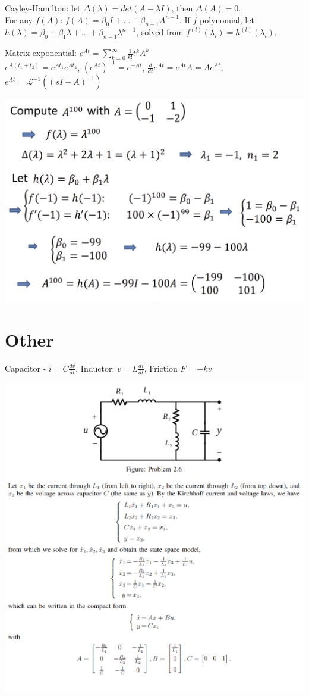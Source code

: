\documentclass[11pt]{article}
\begin{document}
Cayley-Hamilton: let $\Delta(\lambda) = det(A - \lambda I)$, then $\Delta(A) = 0$.\\
For any $f(A)$: $f(A) = \beta_0 I + \dots + \beta_{n-1}A^{n-1}$.
If $f$ polynomial, let $h(\lambda) = \beta_0 + \beta_1 \lambda + \dots + \beta_{n-1} \lambda ^{n-1}$,
solved from $f^{(l)}(\lambda_i) = h^{(l)}(\lambda_i)$.

Matrix exponential: $e^{At} = \sum_{k=0}^\infty \frac{1}{k!} t^k A^k$\\
$e^{A(t_1 + t_2)} = e^{At_1}e^{At_2}$, $(e^{At})^{-1} = e^{-At}$, $\frac{d}{dt} e^{At} = e^{At}A = A e^{At}$,
$e^{At} = \mathcal{L}^{-1}((sI - A)^{-1})$

\begin{center}
    \includegraphics[width=0.9\linewidth]{cayleyhamilton.png}
\end{center}


\section{Other}

Capacitor - $i = C \frac{dv}{dt}$, Inductor: $v = L \frac{di}{dt}$, Friction $F = -k v$

\begin{center}
    \includegraphics[width=0.99 \linewidth]{10-09-p1.png}
\end{center}
\end{document}
